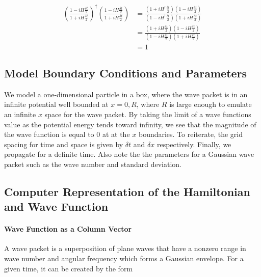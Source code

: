 \documentclass[letterpaper,12pt]{article}
\begin{document}
    \begin{align*}
        \left(
        \frac{1 - iH\frac{\delta t}{2}}{1 + iH\frac{\delta t}{2}}
        \right)^\dag
        \left(
        \frac{1 - iH\frac{\delta t}{2}}{1 + iH\frac{\delta t}{2}}
        \right)
        &=
        \frac{\left(1 + iH^\dag\frac{\delta t}{2}\right)
        \left(1 - iH\frac{\delta t}{2}\right)}
        {\left(1 - iH^\dag\frac{\delta t}{2}\right)
        \left(1 + iH\frac{\delta t}{2}\right)}
        \\
        &=
        \frac{\left(1 + iH\frac{\delta t}{2}\right)
        \left(1 - iH\frac{\delta t}{2}\right)}
        {\left(1 - iH\frac{\delta t}{2}\right)
        \left(1 + iH\frac{\delta t}{2}\right)}
        \\
        &= 1
    \end{align*}
    \vspace{-0.9cm}

    \subsection*{Model Boundary Conditions and Parameters}
    We model a one-dimensional particle in a box, where the wave packet is in an
    infinite potential well bounded at $x = 0, R$, where $R$ is large enough to
    emulate an infinite $x$ space for the wave packet. By taking the limit of a
    wave functions value as the potential energy tends toward infinity, we see
    that the magnitude of the wave function is equal to 0 at at the $x$
    boundaries. To reiterate, the grid spacing for time and space is given by
    $\delta t$ and $\delta x$ respectively. Finally, we propagate for a definite
    time. Also note the the parameters for a Gaussian wave packet such as the
    wave number and standard deviation.

    \subsection*{Computer Representation of the Hamiltonian and Wave Function}

    \paragraph{Wave Function as a Column Vector}
    A wave packet is a superposition of plane waves that have a nonzero range
    in wave number and angular frequency which forms a Gaussian envelope. For a
    given time, it can be created by
    the form
\end{document}
